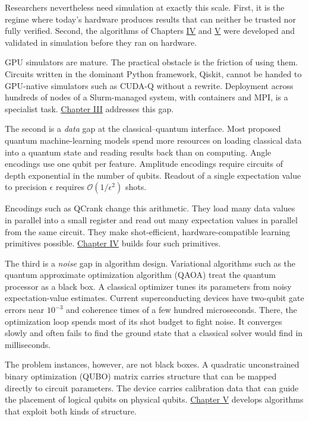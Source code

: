 \documentclass{report}
\theoremstyle{plain}
\theoremstyle{definition}
\theoremstyle{remark}
\newcommand{\bigO}[1]{\mathcal{O}\!\left(#1\right)}
\begin{document}
Researchers nevertheless need simulation at exactly this scale. First, it is the regime where today's hardware produces results that can neither be trusted nor fully verified. Second, the algorithms of Chapters \hyperref[ch:qml]{IV} and \hyperref[ch:nisq]{V} were developed and validated in simulation before they ran on hardware.

GPU simulators are mature. The practical obstacle is the friction of using them. Circuits written in the dominant Python framework, Qiskit, cannot be handed to GPU-native simulators such as CUDA-Q without a rewrite. Deployment across hundreds of nodes of a Slurm-managed system, with containers and MPI, is a specialist task. \hyperref[ch:qgear]{Chapter III} addresses this gap.

The second is a \emph{data} gap at the classical--quantum interface. Most proposed quantum machine-learning models spend more resources on loading classical data into a quantum state and reading results back than on computing. Angle encodings use one qubit per feature. Amplitude encodings require circuits of depth exponential in the number of qubits. Readout of a single expectation value to precision $\epsilon$ requires $\bigO{1/\epsilon^{2}}$ shots.

Encodings such as QCrank change this arithmetic. They load many data values in parallel into a small register and read out many expectation values in parallel from the same circuit. They make shot-efficient, hardware-compatible learning primitives possible. \hyperref[ch:qml]{Chapter IV} builds four such primitives.

The third is a \emph{noise} gap in algorithm design. Variational algorithms such as the quantum approximate optimization algorithm (QAOA) treat the quantum processor as a black box. A classical optimizer tunes its parameters from noisy expectation-value estimates. Current superconducting devices have two-qubit gate errors near $10^{-3}$ and coherence times of a few hundred microseconds. There, the optimization loop spends most of its shot budget to fight noise. It converges slowly and often fails to find the ground state that a classical solver would find in milliseconds.

The problem instances, however, are not black boxes. A quadratic unconstrained binary optimization (QUBO) matrix carries structure that can be mapped directly to circuit parameters. The device carries calibration data that can guide the placement of logical qubits on physical qubits. \hyperref[ch:nisq]{Chapter V} develops algorithms that exploit both kinds of structure.
\end{document}
